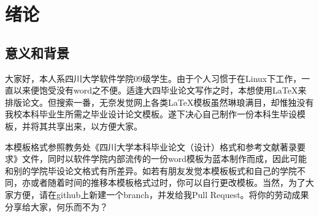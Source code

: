 \chapter{绪论}
\section{意义和背景}
大家好，本人系四川大学软件学院09级学生。由于个人习惯于在Linux下工作，一直以来便饱受没有word之不便。适逢大四毕业论文写作之时，本想使用\LaTeX 来排版论文。但搜索一番，无奈发觉网上各类\LaTeX 模板虽然琳琅满目，却惟独没有我校本科毕业生所需之毕业设计论文模板。遂下决心自己制作一份本科生毕设模板，并将其共享出来，以方便大家。

本模板格式参照教务处《四川大学本科毕业论文（设计）格式和参考文献著录要求》文件，同时以软件学院内部流传的一份word模板为蓝本制作而成，因此可能和别的学院毕设论文格式有所差异。如若有朋友发觉本模板板式和自己的学院不同，亦或者随着时间的推移本模板格式过时，你可以自行更改模板。当然，为了大家方便，请在github上新建一个branch，并发给我Pull Request。将你的劳动成果分享给大家，何乐而不为？